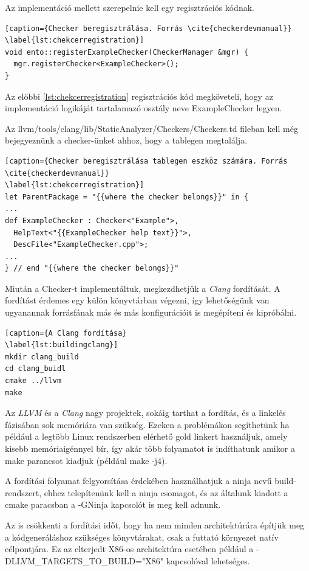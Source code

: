 \documentclass[a4paper,12pt]{report}
\begin{document}
Az implementáció mellett szerepelnie kell egy regisztrációs kódnak.

\begin{lstlisting}[caption={Checker beregisztrálása. Forrás \cite{checkerdevmanual}}
\label{lst:chekcerregistration}]
void ento::registerExampleChecker(CheckerManager &mgr) {
  mgr.registerChecker<ExampleChecker>();
}
\end{lstlisting}

Az előbbi \ref{lst:chekcerregistration} regisztrációs kód megköveteli, hogy az implementáció logikáját tartalamazó osztály neve ExampleChecker legyen.

Az llvm/tools/clang/lib/StaticAnalyzer/Checkers/Checkers.td fileban kell még bejegyeznünk a checker-ünket ahhoz, hogy a tablegen megtalálja.

\begin{lstlisting}[caption={Checker beregisztrálása tablegen eszköz számára. Forrás \cite{checkerdevmanual}}
\label{lst:chekcerregistration}]
let ParentPackage = "{{where the checker belongs}}" in {
...
def ExampleChecker : Checker<"Example">,
  HelpText<"{{ExampleChecker help text}}">,
  DescFile<"ExampleChecker.cpp">;
...
} // end "{{where the checker belongs}}"
\end{lstlisting}

Miután a Checker-t implementáltuk, megkezdhetjük a \emph{Clang} fordítását. A fordítást érdemes egy külön könyvtárban végezni, így lehetőségünk van ugyanannak forrásfának más és más konfigurációit is megépíteni és kipróbálni.

\begin{lstlisting}[caption={A Clang fordítása}
\label{lst:buildingclang}]
mkdir clang_build
cd clang_buidl
cmake ../llvm
make
\end{lstlisting}

Az \emph{LLVM} és a \emph{Clang} nagy projektek, sokáig tarthat a fordítás, és a linkelés fázisában sok memóriára van szükség. Ezeken a problémákon segíthetünk ha például a legtöbb Linux rendszerben elérhető gold linkert használjuk, amely kisebb memóriaigénnyel bír, így akár több folyamatot is indíthatunk amikor a make parancsot kiadjuk (például make -j4).

A fordítási folyamat felgyorsítása érdekében használhatjuk a ninja nevű build-rendszert, ehhez telepítenünk kell a ninja csomagot, és az általunk kiadott a cmake paracsban a -GNinja kapcsolót is meg kell adnunk.

Az is csökkenti a fordítási időt, hogy ha nem minden architektúrára építjük meg a kódgeneráláshoz szükséges könyvtárakat, csak a futtató környezet natív célpontjára. Ez az elterjedt X86-os architektúra esetében például a -DLLVM\_TARGETS\_TO\_BUILD="X86" kapcsolóval lehetséges.
\end{document}

